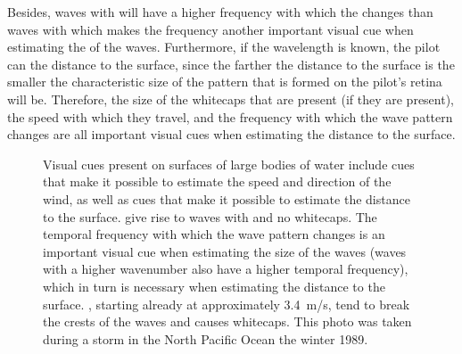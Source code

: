 Besides, waves with  will have a higher frequency with which the  changes than waves with  which makes the frequency another important visual cue when estimating the  of the waves. Furthermore, if the wavelength is known, the pilot can \estimate the distance to the surface, since the farther the distance to the surface is the smaller the characteristic size of the pattern that is formed on the pilot's retina will be. Therefore, the size of the whitecaps that are present (if they are present), the speed with which they travel, and the frequency with which the wave pattern changes are all important visual cues when estimating the distance to the surface.

\begin{figure}
    \centering
    \caption{Visual cues present on surfaces of large bodies of water include cues that make it possible to estimate the speed and direction of the wind, as well as cues that make it possible to estimate the distance to the surface.   give rise to waves with  and no whitecaps. The temporal frequency with which the wave pattern changes is an important visual cue when estimating the size of the waves (waves with a higher wavenumber also have a higher temporal frequency), which in turn is necessary when estimating the distance to the surface.  , starting already at approximately 3.4~m/s, tend to break the crests of the waves and causes whitecaps. This photo was taken during a storm in the North Pacific Ocean the winter 1989.}
    \label{fig:sea_states}
\end{figure}

